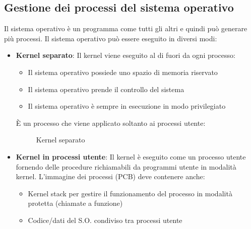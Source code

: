 \documentclass[a4paper]{article}
\begin{document}
\subsection{Gestione dei processi del sistema operativo}
Il sistema operativo è un programma come tutti gli altri e quindi può generare più
processi. Il sistema operativo può essere eseguito in diversi modi:
\begin{itemize}
  \item \textbf{Kernel separato}: Il kernel viene eseguito al di fuori da ogni processo:
    \begin{itemize}
      \item Il sistema operativo possiede uno spazio di memoria riservato
      \item Il sistema operativo prende il controllo del sistema
      \item Il sistema operativo è sempre in esecuzione in modo privilegiato
    \end{itemize}
    È un processo che viene applicato soltanto ai processi utente:
    \begin{figure}[H]
      \centering
      \caption{Kernel separato}
    \end{figure}

  \item \textbf{Kernel in processi utente}: Il kernel è eseguito come un processo
    utente fornendo delle procedure richiamabili da programmi utente in modalità kernel.
    L'immagine dei processi (PCB) deve contenere anche:
    \begin{itemize}
      \item Kernel stack per gestire il funzionamento del processo in modalità protetta
        (chiamate a funzione)
      \item Codice/dati del S.O. condiviso tra processi utente
    \end{itemize}
    \begin{figure}[H]
      \centering
\end{figure}
\end{itemize}
\end{document}

